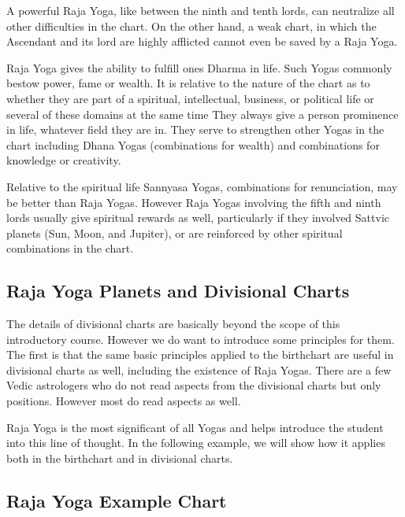 

A powerful Raja Yoga, like between the ninth and tenth lords, can neutralize all other difficulties in the chart. On the other hand, a weak chart, in which the Ascendant and its lord are highly afflicted cannot even be saved by a Raja Yoga.

 

Raja Yoga gives the ability to fulfill ones Dharma in life. Such Yogas commonly bestow power, fame or wealth. It is relative to the nature of the chart as to whether they are part of a spiritual, intellectual, business, or political life or several of these domains at the same time They always give a person prominence in life, whatever field they are in. They serve to strengthen other Yogas in the chart including Dhana Yogas (combinations for wealth) and combinations for knowledge or creativity.

 

Relative to the spiritual life Sannyasa Yogas, combinations for renunciation, may be better than Raja Yogas. However Raja Yogas involving the fifth and ninth lords usually give spiritual rewards as well, particularly if they involved Sattvic planets (Sun, Moon, and Jupiter), or are reinforced by other spiritual combinations in the chart.

 



\subsection{Raja Yoga Planets and Divisional Charts}

 

The details of divisional charts are basically beyond the scope of this introductory course. However we do want to introduce some principles for them. The first is that the same basic principles applied to the birthchart are useful in divisional charts as well, including the existence of Raja Yogas. There are a few Vedic astrologers who do not read aspects from the divisional charts but only positions. However most do read aspects as well.

 

Raja Yoga is the most significant of all Yogas and helps introduce the student into this line of thought. In the following example, we will show how it applies both in the birthchart and in divisional charts.

 

\subsection{Raja Yoga Example Chart}

